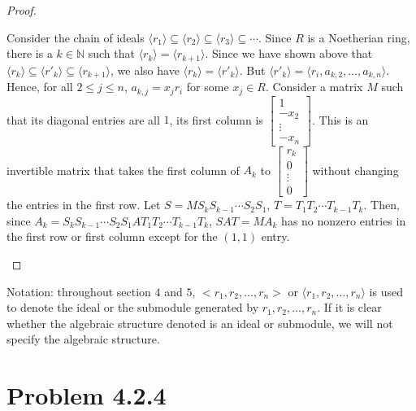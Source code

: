 \documentclass[12pt]{article}
\newcommand{\N}{\mathbb{N}}
\begin{document}
\begin{proof}
\begin{enumerate}
    Consider the chain of ideals $\langle r_1 \rangle \subseteq \langle r_2 \rangle \subseteq \langle r_3 \rangle \subseteq \cdots$. Since $R$ is a Noetherian ring, there is a $k \in \N$ such that $\langle r_k \rangle = \langle r_{k+1} \rangle$. Since we have shown above that $\langle r_k \rangle \subseteq \langle r'_k \rangle \subseteq \langle r_{k+1} \rangle$, we also have $\langle r_k \rangle = \langle r'_k \rangle$. But $\langle r'_k \rangle = \langle r_i, a_{k,2}, \ldots, a_{k,n} \rangle$. Hence, for all $2 \leq j \leq n$, $a_{k, j} = x_j r_i$ for some $x_j \in R$. Consider a matrix $M$ such that its diagonal entries are all $1$, its first column is $\begin{bmatrix} 1 \\ -x_2 \\ \vdots \\ -x_n\end{bmatrix}$. This is an invertible matrix that takes the first column of $A_k$ to $\begin{bmatrix} r_k \\ 0 \\ \vdots \\ 0\end{bmatrix}$ without changing the entries in the first row. Let $S = MS_kS_{k-1}\cdots S_2S_1$, $T = T_1 T_2 \cdots T_{k-1} T_k$. Then, since $A_k = S_kS_{k-1}\cdots S_2S_1 A T_1 T_2 \cdots T_{k-1} T_k$, $SAT = MA_k$ has no nonzero entries in the first row or first column except for the $(1,1)$ entry.
\end{enumerate}
\end{proof}
Notation: throughout section $4$ and $5$, $<r_1, r_2, \ldots, r_n>$ or $\langle r_1, r_2, \ldots, r_n \rangle$ is used to denote the ideal or the submodule generated by $r_1, r_2, \ldots, r_n$. If it is clear whether the algebraic structure denoted is an ideal or submodule, we will not specify the algebraic structure.
\newpage 

\section{Problem 4.2.4}
\end{document}
